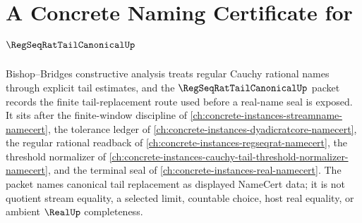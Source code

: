 \chapter{A Concrete Naming Certificate for $\RegSeqRatTailCanonicalUp$}
\label{ch:concrete-instances-regseqrat-tail-canonical-namecert}

Bishop--Bridges constructive analysis treats regular Cauchy rational names through explicit tail estimates, and the $\RegSeqRatTailCanonicalUp$ packet records the finite tail-replacement route used before a real-name seal is exposed. It sits after the finite-window discipline of \autoref{ch:concrete-instances-streamname-namecert}, the tolerance ledger of \autoref{ch:concrete-instances-dyadicratcore-namecert}, the regular rational readback of \autoref{ch:concrete-instances-regseqrat-namecert}, the threshold normalizer of \autoref{ch:concrete-instances-cauchy-tail-threshold-normalizer-namecert}, and the terminal seal of \autoref{ch:concrete-instances-real-namecert}. The packet names canonical tail replacement as displayed NameCert data; it is not quotient stream equality, a selected limit, countable choice, host real equality, or ambient $\RealUp$ completeness.

